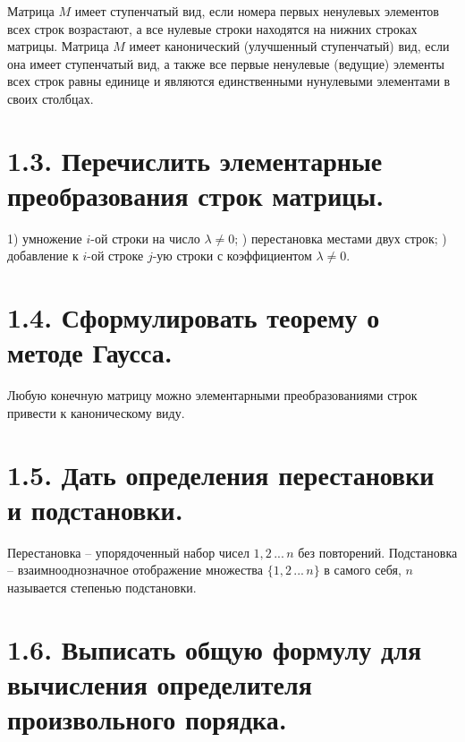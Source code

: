 \documentclass{article}
\begin{document}
Матрица $M$ имеет ступенчатый вид, если номера первых ненулевых элементов всех строк возрастают, а все нулевые строки находятся на нижних строках матрицы.
\newline Матрица $M$ имеет канонический (улучшенный ступенчатый) вид, если она имеет ступенчатый вид, а также все первые ненулевые (ведущие) элементы всех строк равны единице и являются единственными нунулевыми элементами в своих столбцах.

\section*{\LARGE 1.3. Перечислить элементарные преобразования строк матрицы. }

1) умножение $i$-ой строки на число $\lambda \ne 0$;
) перестановка местами двух строк;
) добавление к $i$-ой строке $j$-ую строки с коэффициентом $\lambda \ne 0$.

\section*{\LARGE 1.4. Сформулировать теорему о методе Гаусса.  }

Любую конечную матрицу можно элементарными преобразованиями строк привести к каноническому виду.

\section*{\LARGE 1.5. Дать определения перестановки и подстановки.  }

Перестановка -- упорядоченный набор чисел $1, 2 \,...\, n$ без повторений.
\newline Подстановка -- взаимнооднозначное отображение множества $\{1, 2 \,...\, n\}$ в самого себя, $n$ называется степенью подстановки.

\section*{\LARGE 1.6. Выписать общую формулу для вычисления определителя произвольного порядка.  }
\end{document}
